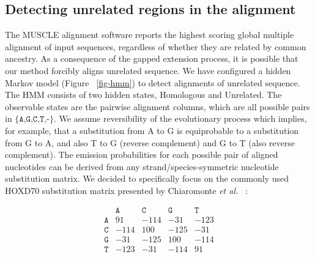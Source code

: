 \documentclass[9.5pt,journal,final,finalsubmission,twocolumn]{IEEEtran}
\begin{document}
\subsection{Detecting unrelated regions in the alignment}
\begin{figure*}[t!]
\centering {}
\caption[Hidden Markov model used to detect pairwise alignments of unrelated
sequence]%
{\textbf{Hidden Markov model used to detect pairwise alignments of unrelated
sequence.} The HMM has states which model alignment columns containing
homologous and unrelated sequence. Emission probabilities are extracted from the HOXD70 substitution matrix and correspond to alignment
columns, for example \texttt{AA} indicates A aligned to A.  gO
indicates gap-open and gE gap extend. Alignment columns are treated as
strand-symmetric, so that AC also indicates CA and the reverse
complements TG and GT.  The emission probabilities are adjusted to the G+C content of the input genome
as described in the text.  The values shown here correspond to a 47.5\% G+C genome.}
\label{fig-hmm}
\end{figure*}
The MUSCLE alignment software reports the highest scoring
global multiple alignment of input sequences, regardless of whether
they are related by common ancestry. As a consequence of the gapped
extension process, it is possible that our method forcibly aligns unrelated
sequence. We have configured a hidden Markov model (Figure
~\ref{fig-hmm}) to detect alignments of unrelated sequence. The HMM
consists of two hidden states, Homologous and Unrelated. The
observable states are the pairwise alignment columns, which are all
possible pairs in $\texttt{{\{A,G,C,T,-\}}}$.  We assume reversibility of the
evolutionary process which implies, for example, that a substitution from A to G is equiprobable to a substitution from G to A, and also T to G (reverse complement) and G to T (also reverse complement).   The emission probabilities for
each possible pair of aligned nucleotides can be derived from any strand/species-symmetric nucleotide substitution matrix.  We decided to specifically focus on the commonly used HOXD70 substitution matrix presented by Chiaromonte \textit{et al.}~\cite{hoxd} :
\large
\begin{center}
\begin{equation}
\begin{array}{crrrr}
  & \texttt{A} & \texttt{C} & \texttt{G} & \texttt{T} \\
\texttt{A} & 91 & -114 & -31 & -123 \\
\texttt{C} & -114 & 100 & -125 & -31 \\
\texttt{G} & -31 & -125 & 100 & -114 \\
\texttt{T} & -123 & -31 & -114 & 91 \\ \end{array}
\end{equation}
\end{center}
\end{document}

